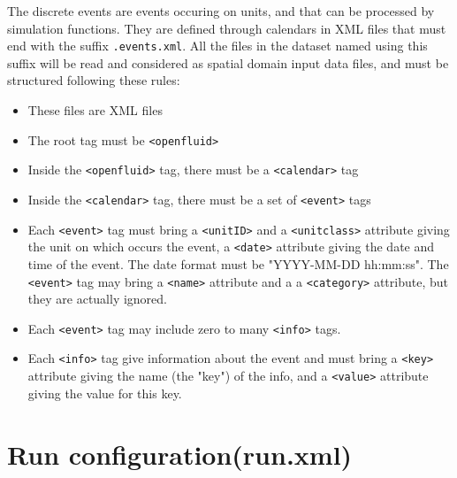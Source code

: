 The discrete events are events occuring on units, and that can be processed by simulation functions. 
\noindent They are defined through calendars in XML files that must end with the suffix \texttt{.events.xml}.
All the files in the dataset named using this suffix will be read and considered as spatial domain input data files, and must be
structured following these rules:
\begin{itemize}
  \item These files are XML files
  \item The root tag must be \texttt{<openfluid>}
  \item Inside the \texttt{<openfluid>} tag, there must be a \texttt{<calendar>} tag
  \item Inside the \texttt{<calendar>} tag, there must be a set of \texttt{<event>} tags 
  \item Each \texttt{<event>} tag must bring a \texttt{<unitID>} and a \texttt{<unitclass>} attribute giving the unit on which occurs the event, a \texttt{<date>} attribute giving the date and time of the event. The date format must be "YYYY-MM-DD hh:mm:ss". 
  The \texttt{<event>} tag may bring a \texttt{<name>} attribute and a a \texttt{<category>} attribute, but they are actually ignored.
  \item Each \texttt{<event>} tag may include zero to many \texttt{<info>} tags.
  \item Each \texttt{<info>} tag give information about the event and must bring a \texttt{<key>} attribute giving the name (the "key") of the info, and a \texttt{<value>} attribute giving the value for this key.        
\end{itemize}  
  

\bigskip

\section{Run configuration(run.xml)}

